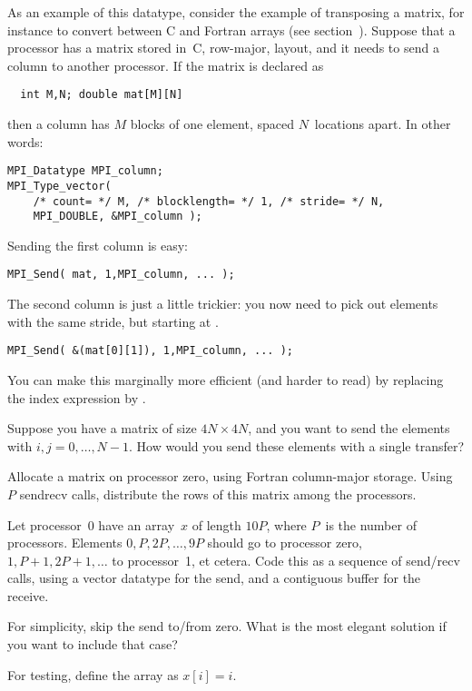 As an example of this datatype, consider the example of transposing
a matrix, for instance to convert between
C and Fortran arrays (see section~). Suppose that 
a processor has a matrix stored in~C, row-major, layout, and it needs
to send a column to another processor. If the matrix is declared as
\begin{verbatim}
  int M,N; double mat[M][N]
\end{verbatim}
then a column has $M$ blocks of one element, spaced $N$~locations apart.
In other words:
\begin{verbatim}
MPI_Datatype MPI_column;
MPI_Type_vector( 
    /* count= */ M, /* blocklength= */ 1, /* stride= */ N,
    MPI_DOUBLE, &MPI_column );
\end{verbatim}
Sending the first column is easy:
\begin{verbatim}
MPI_Send( mat, 1,MPI_column, ... );
\end{verbatim}
The second column is just a little trickier: you now need to pick out 
elements with the same stride, but starting at .
\begin{verbatim}
MPI_Send( &(mat[0][1]), 1,MPI_column, ... );
\end{verbatim}
You can make this marginally more efficient (and harder to read)
by replacing the index expression by .

\begin{exercise}
  Suppose you have a matrix of size $4N\times 4N$, and you want to
  send the elements  with $i,j=0,\ldots,N-1$. How would
  you send these elements with a single transfer?
\end{exercise}

\begin{exercise}
  \label{ex:col-to-row}
  Allocate a matrix on processor zero, using Fortran column-major storage.
  Using $P$ sendrecv calls, distribute the rows of this matrix among the
  processors.
\end{exercise}

\begin{exercise}
  \label{ex:stridesend}
  Let processor~0 have an array~$x$ of length $10P$, where $P$~is the number of processors.
  Elements $0,P,2P,\ldots,9P$ should go to processor zero, $1,P+1,2P+1,\ldots$ to processor~1,
  et cetera. Code this as a sequence of send/recv calls, using a vector datatype
  for the send, and a contiguous buffer for the receive.

  For simplicity, skip the send to/from zero. What is the most elegant
  solution if you want to include that case?

  For testing, define the array as $x[i]=i$.
\end{exercise}

